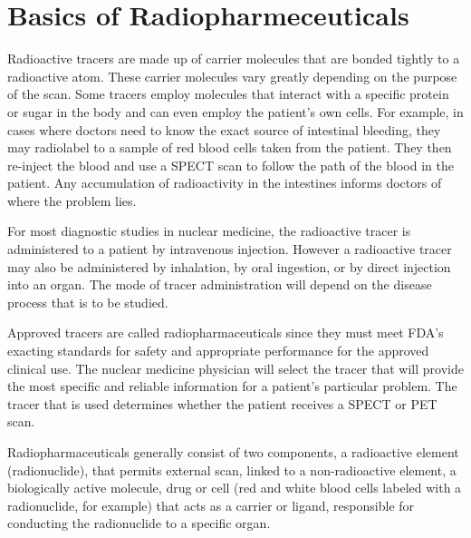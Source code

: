 \documentclass{article}
\begin{document}
\section*{Basics of Radiopharmeceuticals}
Radioactive tracers are made up of carrier molecules that are bonded tightly to a radioactive atom. These carrier molecules vary greatly depending on the purpose of the scan. Some tracers employ molecules that interact with a specific protein or sugar in the body and can even employ the patient’s own cells. For example, in cases where doctors need to know the exact source of intestinal bleeding, they may radiolabel to a sample of red blood cells taken from the patient. They then re-inject the blood and use a SPECT scan to follow the path of the blood in the patient. Any accumulation of radioactivity in the intestines informs doctors of where the problem lies.

For most diagnostic studies in nuclear medicine, the radioactive tracer is administered to a patient by intravenous injection. However a radioactive tracer may also be administered by inhalation, by oral ingestion, or by direct injection into an organ. The mode of tracer administration will depend on the disease process that is to be studied.

Approved tracers are called radiopharmaceuticals since they must meet FDA’s exacting standards for safety and appropriate performance for the approved clinical use. The nuclear medicine physician will select the tracer that will provide the most specific and reliable information for a patient’s particular problem. The tracer that is used determines whether the patient receives a SPECT or PET scan.

Radiopharmaceuticals generally consist of two components, a radioactive element (radionuclide), that permits external scan, linked to a non-radioactive element, a biologically active molecule, drug or cell (red and white blood cells labeled with a radionuclide, for example) that acts as a carrier or ligand, responsible for conducting the radionuclide to a specific organ.
\end{document}
